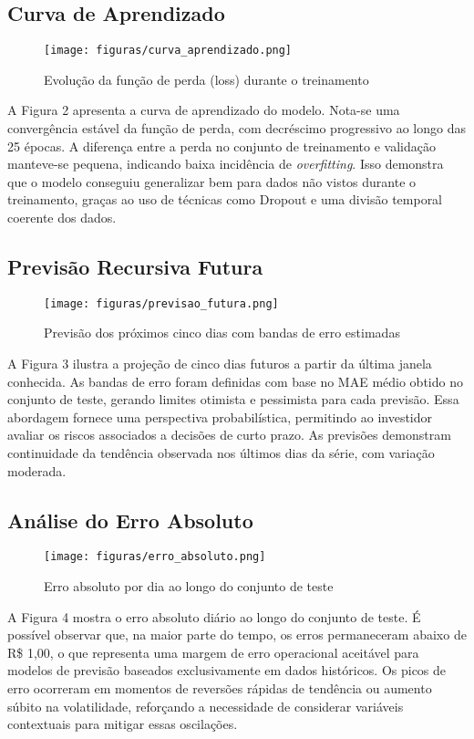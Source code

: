 \documentclass[conference]{IEEEtran}
\begin{document}
\subsection{Curva de Aprendizado}
\begin{figure}[H]
\centering
\texttt{[image: figuras/curva\_aprendizado.png]}
\caption{Evolução da função de perda (loss) durante o treinamento}
\end{figure}

A Figura 2 apresenta a curva de aprendizado do modelo. Nota-se uma convergência estável da função de perda, com decréscimo progressivo ao longo das 25 épocas. A diferença entre a perda no conjunto de treinamento e validação manteve-se pequena, indicando baixa incidência de \textit{overfitting}. Isso demonstra que o modelo conseguiu generalizar bem para dados não vistos durante o treinamento, graças ao uso de técnicas como Dropout e uma divisão temporal coerente dos dados.

\subsection{Previsão Recursiva Futura}
\begin{figure}[H]
\centering
\texttt{[image: figuras/previsao\_futura.png]}
\caption{Previsão dos próximos cinco dias com bandas de erro estimadas}
\end{figure}

A Figura 3 ilustra a projeção de cinco dias futuros a partir da última janela conhecida. As bandas de erro foram definidas com base no MAE médio obtido no conjunto de teste, gerando limites otimista e pessimista para cada previsão. Essa abordagem fornece uma perspectiva probabilística, permitindo ao investidor avaliar os riscos associados a decisões de curto prazo. As previsões demonstram continuidade da tendência observada nos últimos dias da série, com variação moderada.

\subsection{Análise do Erro Absoluto}
\begin{figure}[H]
\centering
\texttt{[image: figuras/erro\_absoluto.png]}
\caption{Erro absoluto por dia ao longo do conjunto de teste}
\end{figure}

A Figura 4 mostra o erro absoluto diário ao longo do conjunto de teste. É possível observar que, na maior parte do tempo, os erros permaneceram abaixo de R\$ 1,00, o que representa uma margem de erro operacional aceitável para modelos de previsão baseados exclusivamente em dados históricos. Os picos de erro ocorreram em momentos de reversões rápidas de tendência ou aumento súbito na volatilidade, reforçando a necessidade de considerar variáveis contextuais para mitigar essas oscilações.
\end{document}
